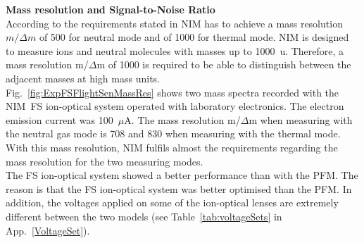 		\textbf{Mass resolution and Signal-to-Noise Ratio}\\
		According to the requirements stated in \cite{red_book} NIM has to achieve a mass resolution $m/\Delta m$ of 500 for neutral mode and of 1000 for thermal mode. NIM is designed to measure ions and neutral molecules with masses up to 1000~u. Therefore, a mass resolution m/$\Delta$m of 1000 is required to be able to distinguish between the adjacent masses at high mass units.\\
		Fig.~\ref{fig:ExpFSFlightSenMassRes} shows two mass spectra recorded with the NIM~FS ion-optical system operated with laboratory electronics. The electron emission current was 100~$\mu$A. The mass resolution m/$\Delta$m when measuring with the neutral gas mode is 708 and 830 when measuring with the thermal mode. With this mass resolution, NIM fulfils almost the requirements regarding the mass resolution for the two measuring modes.\\
		The FS ion-optical system showed a better performance than with the PFM. The reason is that the FS ion-optical system was better optimised than the PFM. In addition, the voltages applied on some of the ion-optical lenses are extremely different between the two models (see Table~\ref{tab:voltageSets} in App.~\ref{VoltageSet}).

